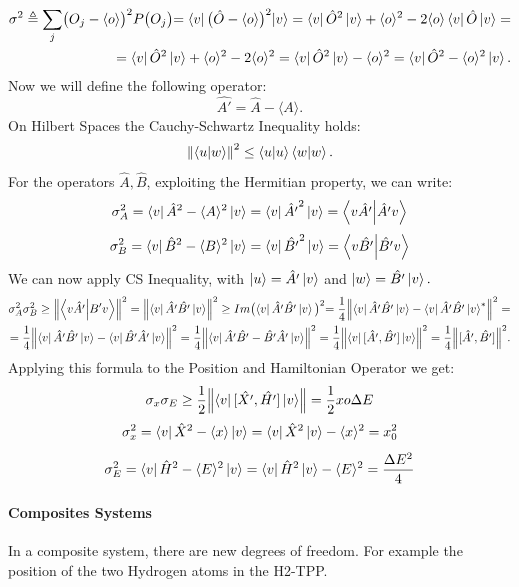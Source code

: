 \documentclass{article}
\begin{document}
\begin{align*}
   \sigma^2 \triangleq \sum_j \bigl( O_j -\langle o \rangle \bigl)^2 P \bigl(O_j\bigl) = \bra{v} \bigl( \hat{O} - \langle o \rangle \bigl)^2 \ket{v}   = \bra{v} \hat{O}^2 \ket{v} + \langle o \rangle^2 -2 \langle o \rangle \bra{v} \hat{O} \ket{v} = \\ = \bra{v} \hat{O}^2 \ket{v} + \langle o \rangle^2 -2 \langle o \rangle^2 = \bra{v} \hat{O}^2 \ket{v} - \langle o \rangle^2 = \bra{v} \hat{O}^2 - \langle o \rangle ^2 \ket{v}.
\end{align*}
Now we will define the following operator:
$$\hat{A'} = \hat{A} - \langle A \rangle.$$
On Hilbert Spaces the Cauchy-Schwartz Inequality holds:
$$ \norm{\bra{u}\ket{w}}^2 \leq \bra{u}\ket{u}\bra{w}\ket{w}. $$
For the operators $\hat{A}, \hat{B}$, exploiting the Hermitian property, we can write:
$$\sigma_A^2 =  \bra{v} \hat{A}^2 - \langle A \rangle ^2 \ket{v} = \bra{v} \hat{A'}^2 \ket{v}= \bra{v \hat{A'}} \ket{\hat{A'} v}$$
$$\sigma_B^2 =  \bra{v} \hat{B}^2 - \langle B \rangle ^2 \ket{v} = \bra{v} \hat{B'}^2 \ket{v}= \bra{v \hat{B'}} \ket{\hat{B'} v}$$ 
We can now apply CS Inequality, with $\ket{u} = \hat{A'}\ket{v}$ and $ \ket{w} = \hat{B'}\ket{v}.$
\begin{align*}
  \sigma_A^2\sigma_B^2 \geq  \norm{\bra{v \hat{A'}}\ket{B'v} }^2 = \norm{ \bra{v} \hat{A'}\hat{B'}\ket{v}}^2 \geq  Im \bigl( \bra{v}\hat{A'}\hat{B'} \ket{v} \bigl)^2 = \frac{1}{4} \norm{ \bra{v}\hat{A'}\hat{B'}\ket{v} - \bra{v}\hat{A'}\hat{B'}\ket{v}^* }^2 = \\ 
  =\frac{1}{4} \norm{ \bra{v}\hat{A'}\hat{B'}\ket{v} - \bra{v}\hat{B'}\hat{A'}\ket{v} }^2 = \frac{1}{4} \norm{ \bra{v}\hat{A'}\hat{B'} - \hat{B'}\hat{A'}\ket{v} }^2 = \frac{1}{4} \norm{ \bra{v} [\hat{A'},\hat{B'}]\ket{v} }^2 = \frac{1}{4} \norm{[\hat{A'},\hat{B'}] }^2 .
\end{align*}
Applying this formula to the Position and Hamiltonian Operator we get:
$$ \sigma_x \sigma_E \geq \frac{1}{2} \norm{ \bra{v} [\hat{X'},\hat{H'}]\ket{v} } = \frac{1}{2} xo \Delta E$$
$$ \sigma_x^2 = \bra{v} \hat{X}^2 - \langle x \rangle \ket{v} = \bra{v} \hat{X}^2 \ket{v} - \langle x \rangle^2 = x_0^2$$
$$\sigma_E^2 = \bra{v} \hat{H}^2 - \langle E \rangle ^2 \ket{v} = \bra{v} \hat{H}^2 \ket{v} - \langle E \rangle ^2 = \frac{\Delta E^2}{4}$$

\paragraph{Composites Systems}In a composite system, there are new degrees of freedom. For example the position of the two Hydrogen atoms in the H2-TPP. \\ \\
\end{document}
